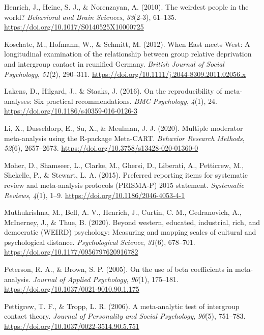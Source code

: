 \documentclass[12pt, letterpaper]{article}
\begin{document}
\leavevmode\hypertarget{ref-henrich_weirdest_2010}{}%
Henrich, J., Heine, S. J., \& Norenzayan, A. (2010). The weirdest people
in the world? \emph{Behavioral and Brain Sciences}, \emph{33}(2-3),
61--135. \url{https://doi.org/10.1017/S0140525X10000725}

\leavevmode\hypertarget{ref-koschate_when_2012}{}%
Koschate, M., Hofmann, W., \& Schmitt, M. (2012). When East meets West:
A longitudinal examination of the relationship between group relative
deprivation and intergroup contact in reunified Germany. \emph{British
Journal of Social Psychology}, \emph{51}(2), 290--311.
\url{https://doi.org/10.1111/j.2044-8309.2011.02056.x}

\leavevmode\hypertarget{ref-lakens_reproducibility_2016}{}%
Lakens, D., Hilgard, J., \& Staaks, J. (2016). On the reproducibility of
meta-analyses: Six practical recommendations. \emph{BMC Psychology},
\emph{4}(1), 24. \url{https://doi.org/10.1186/s40359-016-0126-3}

\leavevmode\hypertarget{ref-li_multiple_2020}{}%
Li, X., Dusseldorp, E., Su, X., \& Meulman, J. J. (2020). Multiple
moderator meta-analysis using the R-package Meta-CART. \emph{Behavior
Research Methods}, \emph{52}(6), 2657--2673.
\url{https://doi.org/10.3758/s13428-020-01360-0}

\leavevmode\hypertarget{ref-moher_preferred_2015}{}%
Moher, D., Shamseer, L., Clarke, M., Ghersi, D., Liberati, A.,
Petticrew, M., Shekelle, P., \& Stewart, L. A. (2015). Preferred
reporting items for systematic review and meta-analysis protocols
(PRISMA-P) 2015 statement. \emph{Systematic Reviews}, \emph{4}(1), 1--9.
\url{https://doi.org/10.1186/2046-4053-4-1}

\leavevmode\hypertarget{ref-muthukrishna_beyond_2020}{}%
Muthukrishna, M., Bell, A. V., Henrich, J., Curtin, C. M., Gedranovich,
A., McInerney, J., \& Thue, B. (2020). Beyond western, educated,
industrial, rich, and democratic (WEIRD) psychology: Measuring and
mapping scales of cultural and psychological distance.
\emph{Psychological Science}, \emph{31}(6), 678--701.
\url{https://doi.org/10.1177/0956797620916782}

\leavevmode\hypertarget{ref-peterson_use_2005}{}%
Peterson, R. A., \& Brown, S. P. (2005). On the use of beta coefficients
in meta-analysis. \emph{Journal of Applied Psychology}, \emph{90}(1),
175--181. \url{https://doi.org/10.1037/0021-9010.90.1.175}

\leavevmode\hypertarget{ref-pettigrew_meta-analytic_2006}{}%
Pettigrew, T. F., \& Tropp, L. R. (2006). A meta-analytic test of
intergroup contact theory. \emph{Journal of Personality and Social
Psychology}, \emph{90}(5), 751--783.
\url{https://doi.org/10.1037/0022-3514.90.5.751}
\end{document}
